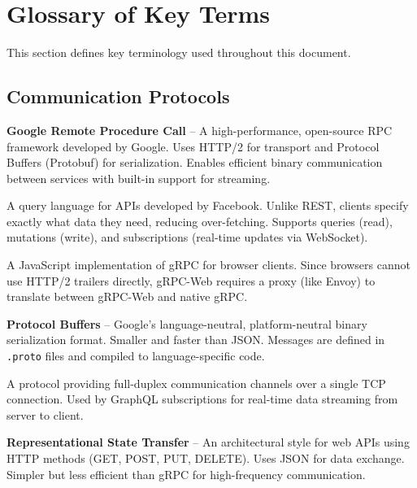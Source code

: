 \section{Glossary of Key Terms}

This section defines key terminology used throughout this document.

\subsection{Communication Protocols}

\begin{description}[style=nextline, leftmargin=2cm]
    \item[gRPC] \textbf{Google Remote Procedure Call} -- A high-performance, open-source RPC framework developed by Google. Uses HTTP/2 for transport and Protocol Buffers (Protobuf) for serialization. Enables efficient binary communication between services with built-in support for streaming.

    \item[GraphQL] A query language for APIs developed by Facebook. Unlike REST, clients specify exactly what data they need, reducing over-fetching. Supports queries (read), mutations (write), and subscriptions (real-time updates via WebSocket).

    \item[gRPC-Web] A JavaScript implementation of gRPC for browser clients. Since browsers cannot use HTTP/2 trailers directly, gRPC-Web requires a proxy (like Envoy) to translate between gRPC-Web and native gRPC.

    \item[Protobuf] \textbf{Protocol Buffers} -- Google's language-neutral, platform-neutral binary serialization format. Smaller and faster than JSON. Messages are defined in \texttt{.proto} files and compiled to language-specific code.

    \item[WebSocket] A protocol providing full-duplex communication channels over a single TCP connection. Used by GraphQL subscriptions for real-time data streaming from server to client.

    \item[REST] \textbf{Representational State Transfer} -- An architectural style for web APIs using HTTP methods (GET, POST, PUT, DELETE). Uses JSON for data exchange. Simpler but less efficient than gRPC for high-frequency communication.
\end{description}

